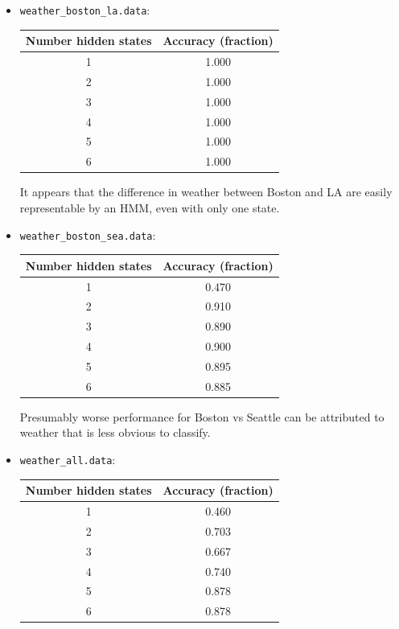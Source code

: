 \documentclass{article}
\begin{document}
\begin{enumerate}[(a)]
\begin{enumerate}
    \begin{itemize}
    \item \texttt{weather\_boston\_la.data}:\\

      \begin{tabular}{|cc|}
        \hline
        Number hidden states & Accuracy (fraction)\\
        \hline
        1 & 1.000\\
        2 & 1.000\\
        3 & 1.000\\
        4 & 1.000\\
        5 & 1.000\\
        6 & 1.000\\
        \hline
      \end{tabular}

      It appears that the difference in weather between Boston and LA are
      easily representable by an HMM, even with only one state.

    \item \texttt{weather\_boston\_sea.data}:\\

      \begin{tabular}{|cc|}
        \hline
        Number hidden states & Accuracy (fraction)\\
        \hline
        1 & 0.470\\
        2 & 0.910\\
        3 & 0.890\\
        4 & 0.900\\
        5 & 0.895\\
        6 & 0.885\\
        \hline
      \end{tabular}

      Presumably worse performance for Boston vs Seattle can be attributed
      to weather that is less obvious to classify.

    \item \texttt{weather\_all.data}:\\

      \begin{tabular}{|cc|}
        \hline
        Number hidden states & Accuracy (fraction)\\
        \hline
        1 & 0.460\\
        2 & 0.703\\
        3 & 0.667\\
        4 & 0.740\\
        5 & 0.878\\
        6 & 0.878\\
        \hline
      \end{tabular}


\end{itemize}
\end{enumerate}
\end{enumerate}
\end{document}
